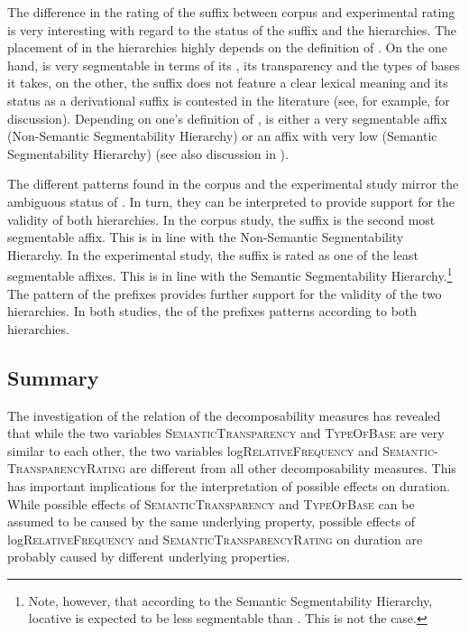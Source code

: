 The difference in the rating of the suffix  between corpus and experimental rating is very interesting with regard to the  status of the suffix and the  hierarchies. The placement of  in the  hierarchies highly depends on the definition of . On the one hand,  is very segmentable in terms of its , its transparency and the types of bases it takes, on the other, the suffix does not feature a clear lexical meaning and its status as a derivational suffix is contested in the literature (see, for example, \citealt{Zwicky.1995,Plag.2003,Giegerich.2012,Bauer.2013} for discussion). Depending on one's definition of ,  is either a very segmentable affix (Non-Semantic Segmentability Hierarchy) or an affix with very low  (Semantic Segmentability Hierarchy) (see also discussion in ). 

The different  patterns found in the corpus and the experimental study mirror the ambiguous  status of . In turn, they can be interpreted to provide support for the validity of both  hierarchies. 
In the corpus study, the suffix  is the second most segmentable affix. This is in line with the Non-Semantic Segmentability Hierarchy. 
In the experimental study, the suffix  is rated as one of the least segmentable affixes. This is in line with the Semantic Segmentability Hierarchy.\footnote{Note, however, that according to the Semantic Segmentability Hierarchy, locative  is expected to be less segmentable than . This is not the case. }
The  pattern of the prefixes provides further support for the validity of the two hierarchies. In both studies, the  of the prefixes patterns according to both hierarchies. 



\subsection{Summary}\largerpage

The investigation of the relation of the decomposability measures has revealed that while the two variables \textsc{SemanticTransparency} and \textsc{TypeOfBase} are very similar to each other, the two variables log\textsc{RelativeFrequency} and \textsc{Semantic-TransparencyRating} are different from all other decomposability measures.
This has important implications for the interpretation of possible  effects on duration. While possible effects of \textsc{SemanticTransparency} and \textsc{TypeOfBase} can be assumed to be caused by the same underlying property, possible effects of log\textsc{RelativeFrequency} and \textsc{SemanticTransparencyRating} on duration are probably caused by different underlying properties.



